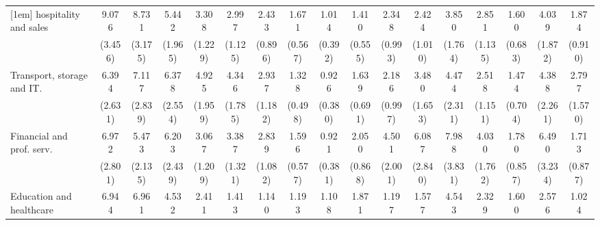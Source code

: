 {\begin{tabular}{l*{16}{c}}
[1em]
hospitality and sales&       9.076\sym{***}&       8.731\sym{***}&       5.442\sym{***}&       3.308\sym{**} &       2.997\sym{**} &       2.433\sym{*}  &       1.671         &       1.014         &       1.410         &       2.348\sym{*}  &       2.424\sym{*}  &       3.850\sym{**} &       2.851\sym{**} &       1.600         &       4.039\sym{**} &       1.874         \\
                    &     (3.456)         &     (3.175)         &     (1.965)         &     (1.229)         &     (1.125)         &     (0.896)         &     (0.567)         &     (0.392)         &     (0.555)         &     (0.993)         &     (1.010)         &     (1.764)         &     (1.135)         &     (0.683)         &     (1.872)         &     (0.910)         \\
[1em]
Transport, storage and IT.&       6.394\sym{***}&       7.117\sym{***}&       6.378\sym{***}&       4.925\sym{***}&       4.346\sym{***}&       2.937\sym{**} &       1.328         &       0.926         &       1.639         &       2.186         &       3.480\sym{**} &       4.474\sym{**} &       2.518\sym{*}  &       1.474         &       4.388\sym{**} &       2.797         \\
                    &     (2.631)         &     (2.839)         &     (2.554)         &     (1.959)         &     (1.785)         &     (1.182)         &     (0.498)         &     (0.380)         &     (0.691)         &     (0.997)         &     (1.653)         &     (2.311)         &     (1.151)         &     (0.704)         &     (2.261)         &     (1.570)         \\
[1em]
Financial and prof. serv.&       6.972\sym{***}&       5.473\sym{***}&       6.203\sym{***}&       3.067\sym{**} &       3.387\sym{**} &       2.839\sym{**} &       1.596         &       0.921         &       2.050         &       4.501\sym{***}&       6.087\sym{***}&       7.988\sym{***}&       4.030\sym{**} &       1.780         &       6.490\sym{***}&       1.713         \\
                    &     (2.801)         &     (2.135)         &     (2.439)         &     (1.209)         &     (1.321)         &     (1.082)         &     (0.577)         &     (0.381)         &     (0.868)         &     (2.001)         &     (2.840)         &     (3.831)         &     (1.762)         &     (0.857)         &     (3.234)         &     (0.877)         \\
[1em]
Education and healthcare&       6.944\sym{***}&       6.961\sym{***}&       4.532\sym{**} &       2.411         &       1.413         &       1.140         &       1.193         &       1.108         &       1.871         &       1.197         &       1.577         &       4.543\sym{*}  &       2.329         &       1.600         &       2.576         &       1.024         \\

\end{tabular}}
